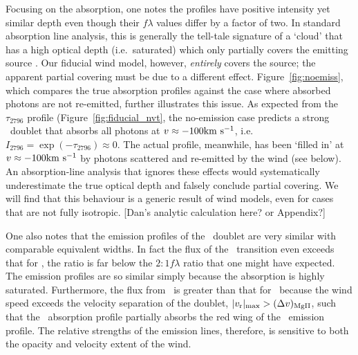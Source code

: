 \documentclass[12pt,preprint]{aastex}
\begin{document}
Focusing on the  absorption, one notes the profiles have
positive intensity yet similar depth even though their $f\lambda$
values differ by a factor of two.  In standard absorption line
analysis, this is generally 
the tell-tale signature of a `cloud' that has a high optical depth (i.e.\
saturated) which only partially covers the emitting source
\citep[e.g.][]{hamman10}.  Our fiducial wind model, however, 
{\it entirely} covers the source; the apparent partial covering must
be due to a different effect.
Figure~\ref{fig:noemiss}, which compares the true
absorption profiles against the case where absorbed photons are not
re-emitted, further illustrates this issue.   As expected from the
$\tau_{2796}$ profile (Figure~\ref{fig:fiducial_nvt}, the no-emission
case predicts a strong \mgiid\ doublet that absorbs all photons at
$v \approx -100 {\rm km~s^{-1}}$, i.e.\ $I_{2796} = \exp(-\tau_{2796}) \approx 0$.
The actual profile, meanwhile, has been `filled in' at $v \approx -100
{\rm km~s^{-1}}$ by photons scattered and re-emitted by the wind (see below).  An
absorption-line analysis that ignores these effects
\citep[e.g.][]{sato} would systematically underestimate the true optical
depth and falsely conclude partial covering.  We will find that this
behaviour is a generic result of wind models, even for cases that are
not fully isotropic.
[Dan's analytic calculation here? or Appendix?]

One also notes that the emission profiles of the \mgiid\ doublet
are very similar with comparable equivalent widths.  In fact the
flux of the \mgiib\ transition even exceeds that for \mgiia, the ratio
is far below the $2:1 f\lambda$ ratio that one might have expected. The
emission profiles are so similar simply because the absorption is
highly saturated.
Furthermore, the flux from \mgiib\ is greater than that for
\mgiia\ because the wind speed exceeds the velocity separation
of the doublet, $|v_{\rm r}|_{\rm max} > (\Delta v)_{\rm MgII}$, such
that the \mgiib\ absorption profile partially absorbs the red wing of the
\mgiia\ emission profile.  The relative strengths of the emission
lines, therefore, is sensitive to both the opacity and velocity
extent of the wind.
\end{document}
